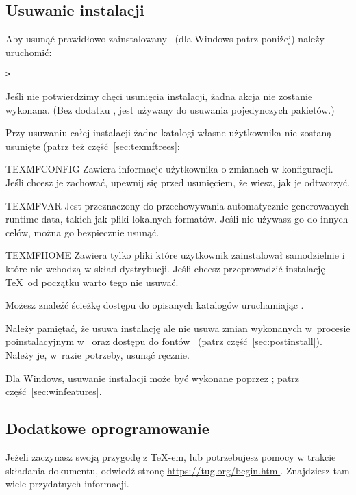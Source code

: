 \documentclass{article}
\begin{document}
\subsection{Usuwanie instalacji \TL}
\label{sec:uninstall}

Aby usunąć prawidłowo zainstalowany \TL\ (dla Windows patrz poniżej) należy uruchomić:

\begin{alltt}
> 
\end{alltt}
Jeśli nie potwierdzimy chęci usunięcia instalacji, żadna akcja nie zostanie wykonana.
(Bez dodatku ,    jest używany do usuwania pojedynczych pakietów.)

Przy usuwaniu całej instalacji   żadne katalogi własne użytkownika nie zostaną usunięte (patrz też część~\ref{sec:texmftrees}:
 
\begin{ttdescription}
\item [TEXMFCONFIG]  Zawiera informacje użytkownika o   zmianach w konfiguracji. 
Jeśli chcesz je zachować, upewnij się przed usunięciem, że wiesz, jak je odtworzyć.

\item [TEXMFVAR]  Jest  przeznaczony do przechowywania automatycznie generowanych
  runtime data, takich jak pliki  lokalnych formatów. Jeśli nie używasz go do
innych celów, można go bezpiecznie usunąć.

\item[TEXMFHOME] Zawiera tylko pliki które użytkownik zainstalował  samodzielnie i które nie wchodzą w skład dystrybucji. Jeśli  chcesz przeprowadzić instalację \TeX\ od początku  warto  tego nie usuwać.

\end{ttdescription}

\noindent Możesz znaleźć ścieżkę dostępu do opisanych katalogów uruchamiając  
 .
 
Należy pamiętać, że  usuwa instalację ale nie usuwa zmian wykonanych w~procesie poinstalacyjnym  w~ oraz dostępu   do fontów \TL\ (patrz część~\ref{sec:postinstall}). 
 Należy je, w~razie potrzeby, usunąć ręcznie.

Dla Windows, usuwanie instalacji może być wykonane poprzez \GUI; patrz część~\ref{sec:winfeatures}.


\subsection{Dodatkowe oprogramowanie}
Jeżeli zaczynasz swoją przygodę z \TeX-em, lub potrzebujesz pomocy w trakcie składania dokumentu, odwiedź stronę \url{https://tug.org/begin.html}. Znajdziesz tam wiele przydatnych informacji.
\end{document}
